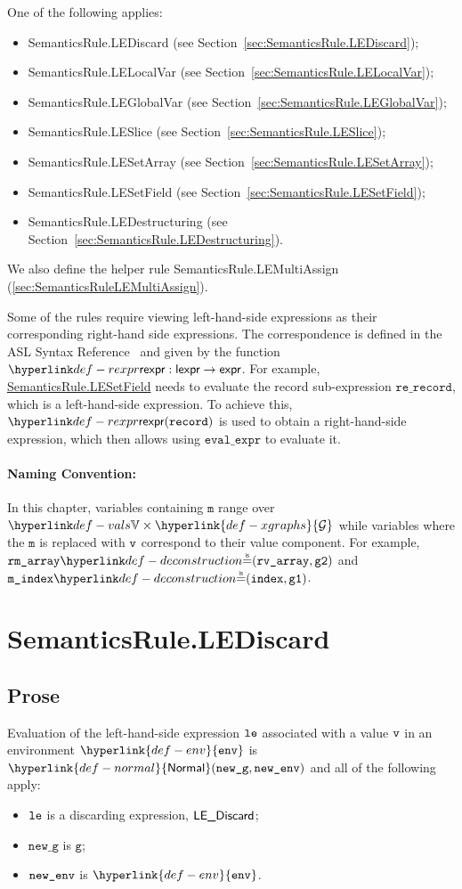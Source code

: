 \documentclass{book}
\newcommand\XGraphs[0]{\hyperlink{def-xgraphs}{\mathcal{G}}}
\newcommand\Normal[0]{\hyperlink{def-normal}{\textsf{Normal}}}
\newcommand\env[0]{\hyperlink{def-env}{\texttt{env}}}
\newcommand\vg[0]{\texttt{g}}
\newcommand\newg[0]{\texttt{new\_g}}
\newcommand\vm[0]{\texttt{m}}
\newcommand\mindex[0]{\texttt{m\_index}}
\newcommand\rvarray[0]{\texttt{rv\_array}}
\newcommand\rmarray[0]{\texttt{rm\_array}}
\newcommand\record[0]{\texttt{record}}
\newcommand\rerecord[0]{\texttt{re\_record}}
\begin{document}
One of the following applies:
\begin{itemize}
\item SemanticsRule.LEDiscard (see Section~\ref{sec:SemanticsRule.LEDiscard});
\item SemanticsRule.LELocalVar (see Section~\ref{sec:SemanticsRule.LELocalVar});
\item SemanticsRule.LEGlobalVar (see Section~\ref{sec:SemanticsRule.LEGlobalVar});
\item SemanticsRule.LESlice (see Section~\ref{sec:SemanticsRule.LESlice});
\item SemanticsRule.LESetArray (see Section~\ref{sec:SemanticsRule.LESetArray});
\item SemanticsRule.LESetField (see Section~\ref{sec:SemanticsRule.LESetField});
\item SemanticsRule.LEDestructuring (see Section~\ref{sec:SemanticsRule.LEDestructuring}).
\end{itemize}

We also define the helper rule SemanticsRule.LEMultiAssign (\ref{sec:SemanticsRuleLEMultiAssign}).

\hypertarget{def-rexpr}{}
Some of the rules require viewing left-hand-side expressions as their corresponding right-hand side expressions.
The correspondence is defined in the ASL Syntax Reference~\cite[Chapter 5]{ASLAbstractSyntaxReference}
and given by the function $\torexpr : \lexpr \rightarrow \expr$.
%
For example, \hyperlink{SemanticsRule.LESetField}{SemanticsRule.LESetField}
needs to evaluate the record sub-expression $\rerecord$, which is a left-hand-side expression.
To achieve this, $\torexpr(\record)$ is used to obtain a right-hand-side expression, which then allows
using $\texttt{eval\_expr}$ to evaluate it.

\paragraph{Naming Convention:}
In this chapter, variables containing $\vm$ range over $\vals\times\XGraphs$
while variables where the $\vm$ is replaced with $\texttt{v}$ correspond to their value component.
For example, $\rmarray\eqname(\rvarray,\vgtwo)$ and $\mindex\eqname(\vindex, \vgone)$.

\section{SemanticsRule.LEDiscard \label{sec:SemanticsRule.LEDiscard}}
    \subsection{Prose}
    Evaluation of the left-hand-side expression $\texttt{le}$ associated with a
    value $\texttt{v}$ in an environment $\env$ is $\Normal(\newg, \newenv)$
    and all of the following apply:
    \begin{itemize}
    \item $\texttt{le}$ is a discarding expression, $\textsf{LE\_Discard}$;
    \item $\newg$ is $\vg$;
    \item $\texttt{new\_env}$ is $\env$.
    \end{itemize}
\end{document}
